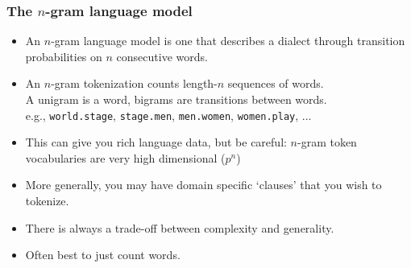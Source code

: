 \documentclass[
  shownotes,
  xcolor={svgnames},
  hyperref={colorlinks,citecolor=DarkBlue,linkcolor=DarkRed,urlcolor=DarkBlue}
  , aspectratio=169]{beamer}
\newcommand{\theme}{\color{andesred}}
\newcommand{\gr}{\color{black!60}}
\newcommand{\sg}{\color{DarkSlateGray}}
\begin{document}
\begin{frame}[fragile]
\frametitle{The $n$-gram language model}

\begin{itemize}

\item An $n$-gram language model is one that describes a dialect through transition probabilities on $n$ consecutive words.

\medskip

\item An {\theme $n$-gram tokenization} counts length-$n$ sequences of words.\\
{\sg A unigram is a word, bigrams are transitions between words.}\\
{\gr e.g., {\tt world.stage}, {\tt stage.men}, {\tt men.women}, {\tt women.play}, ...}

\medskip

\item This can give you rich language data, but be careful: $n$-gram token vocabularies are very high dimensional ($p^n$)
\medskip
\item  More generally, you may have domain specific `clauses' that you wish to tokenize.
\medskip
\item  There is always a trade-off between complexity and generality. 
\medskip
\item {\theme Often best to just count words.}

\end{itemize}


\end{frame}
\end{document}
